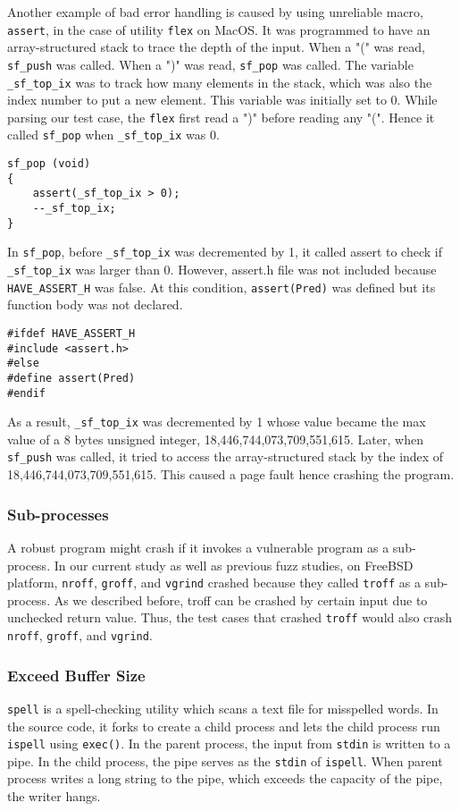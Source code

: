 Another example of bad error handling is caused by using unreliable macro, \texttt{assert}, in the case of utility \texttt{flex} on MacOS. It was programmed to have an array-structured stack to trace the depth of the input. When a "(" was read, \texttt{sf\_push} was called. When a ")" was read, \texttt{sf\_pop} was called. The variable \texttt{\_sf\_top\_ix} was to track how many elements in the stack, which was also the index number to put a new element. This variable was initially set to 0. While parsing our test case, the \texttt{flex} first read a ")" before reading any "(". Hence it called \texttt{sf\_pop} when \texttt{\_sf\_top\_ix} was 0. 

\begin{verbatim}
sf_pop (void)
{
    assert(_sf_top_ix > 0);
    --_sf_top_ix;
}
\end{verbatim}

In \texttt{sf\_pop}, before \texttt{\_sf\_top\_ix} was decremented by 1, it called assert to check if \texttt{\_sf\_top\_ix}  was larger than 0. However, assert.h file was not included because \texttt{HAVE\_ASSERT\_H} was false. At this condition, \texttt{assert(Pred)} was defined but its function body was not declared. 

\begin{verbatim}
#ifdef HAVE_ASSERT_H
#include <assert.h>
#else
#define assert(Pred)
#endif
\end{verbatim}

As a result, \texttt{\_sf\_top\_ix} was decremented by 1 whose value became the max value of a 8 bytes unsigned integer, 18,446,744,073,709,551,615. Later, when \texttt{sf\_push} was called, it tried to access the array-structured stack by the index of 18,446,744,073,709,551,615. This caused a page fault hence crashing the program.

\subsubsection{Sub-processes}
A robust program might crash if it invokes a vulnerable program as a sub-process. In our current study as well as previous fuzz studies, on FreeBSD platform, \texttt{nroff}, \texttt{groff}, and \texttt{vgrind} crashed because they called \texttt{troff} as a sub-process. As we described before, troff can be crashed by certain input due to unchecked return value. Thus, the test cases that crashed \texttt{troff} would also crash \texttt{nroff}, \texttt{groff}, and \texttt{vgrind}.

\subsubsection{Exceed Buffer Size}
\texttt{spell} is a spell-checking utility which scans a text file for misspelled words. In the source code, it forks to create a child process and lets the child process run \texttt{ispell} using \texttt{exec()}. In the parent process, the input from \texttt{stdin} is written to a pipe. In the child process, the pipe serves as the \texttt{stdin} of \texttt{ispell}. When parent process writes a long string to the pipe, which exceeds the capacity of the pipe, the writer hangs.


